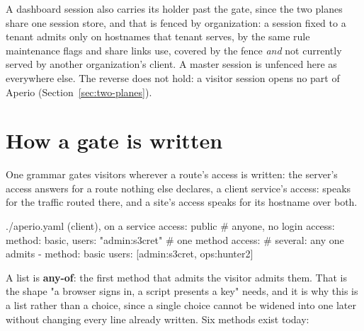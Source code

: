 \documentclass[11pt,a4paper,oneside]{book}
\newcommand{\aperiobreakableunderscore}{\textunderscore\allowbreak}
\newcommand{\aperiocodebreaks}{\XeTeXinterchartokenstate=1 }
\newcommand{\aperiocodebreaks}{}
\DeclareRobustCommand{\code}[1]{{\ttfamily\small\aperiocodebreaks
  \let\_\aperiobreakableunderscore#1}}
\begin{document}
A dashboard session also carries its holder past the gate, since the two
planes share one session store, and that is fenced by organization: a
session fixed to a tenant admits only on hostnames that tenant serves,
by the same rule maintenance flags and share links use, covered by the
fence \emph{and} not currently served by another organization's client.
A master session is unfenced here as everywhere else. The reverse does
not hold: a visitor session opens no part of Aperio
(Section~\ref{sec:two-planes}).

\section{How a gate is written}
\label{sec:visitor-auth}

One grammar gates visitors wherever a route's access is written: the
server's \code{access} answers for a route nothing else declares, a client
service's \code{access:} speaks for the traffic routed there, and a site's
\code{access} speaks for its hostname over both.

\begin{codecard}[aperioyaml]{./aperio.yaml (client), on a service}
access: public                                    # anyone, no login
access: { method: basic, users: "admin:s3cret" }  # one method
access:                                           # several: any one admits
  - method: basic
    users: [admin:s3cret, ops:hunter2]
\end{codecard}

A list is \textbf{any-of}: the first method that admits the visitor
admits them. That is the shape "a browser signs in, a script presents a
key" needs, and it is why this is a list rather than a choice, since a
single choice cannot be widened into one later without changing every
line already written. Six methods exist today:
\end{document}
